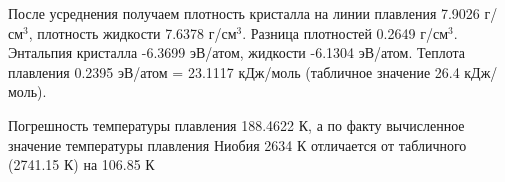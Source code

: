 \documentclass[a4paper,oneside,14pt]{extreport}
\begin{document}
После усреднения получаем плотность кристалла на линии плавления 7.9026 г/см$^3$,
плотность жидкости 7.6378 г/см$^3$. Разница плотностей 0.2649 г/см$^3$.
Энтальпия кристалла -6.3699 эВ/атом, жидкости -6.1304 эВ/атом. Теплота плавления
0.2395 эВ/атом = 23.1117 кДж/моль (табличное значение 26.4 кДж/моль).

Погрешность температуры плавления 188.4622 К, а по факту вычисленное значение температуры плавления Ниобия 2634 К отличается от табличного (2741.15 К) на 106.85 К
\end{document}
